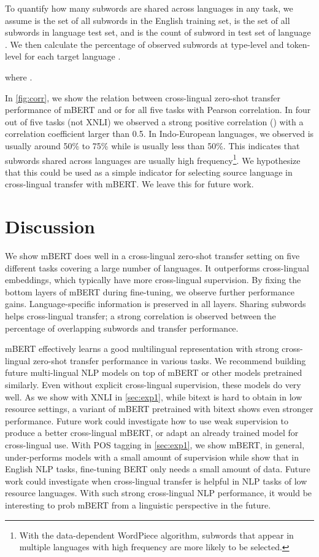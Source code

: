 \documentclass[11pt,a4paper]{article}
\begin{document}
To quantify how many subwords are shared across languages in any task, we assume  is the set of all subwords in the English training set,  is the set of all subwords in language  test set, and  is the count of subword  in test set of language . We then calculate the percentage of observed subwords at type-level  and token-level  for each target language .

where .

In \cref{fig:corr}, we show the relation between cross-lingual zero-shot transfer performance of mBERT and  or  for all five tasks with Pearson correlation. In four out of five tasks (not XNLI) we observed a strong positive correlation  () with a correlation coefficient larger than 0.5. In Indo-European languages, we observed  is usually around 50\% to 75\% while  is usually less than 50\%. This indicates that subwords shared across languages are usually high frequency\footnote{With the data-dependent WordPiece algorithm, subwords that appear in multiple languages with high frequency are more likely to be selected.}. We hypothesize that this could be used as a simple indicator for selecting source language in cross-lingual transfer with mBERT. We leave this for future work.

\section{Discussion}
We show mBERT does well in a cross-lingual zero-shot transfer setting on five different tasks covering a large number of languages. 
It outperforms cross-lingual embeddings, which typically have more cross-lingual supervision. By fixing the bottom layers of mBERT during fine-tuning, we observe further performance gains. Language-specific information is preserved in all layers. Sharing subwords helps cross-lingual transfer; a strong correlation is observed between the percentage of overlapping subwords and transfer performance.

mBERT effectively learns a good multilingual representation with strong cross-lingual zero-shot transfer performance in various tasks. We recommend building future multi-lingual NLP models on top of mBERT or other models pretrained similarly. Even without explicit cross-lingual supervision, these models do very well. As we show with XNLI in \cref{sec:exp1}, while bitext is hard to obtain in low resource settings, a variant of mBERT pretrained with bitext \cite{lample2019cross} shows even stronger performance. Future work could investigate how to use weak supervision to produce a better cross-lingual mBERT, or adapt an already trained model for cross-lingual use. With POS tagging in \cref{sec:exp1}, we show mBERT, in general, under-performs models with a small amount of supervision while \citet{devlin-etal-2019-bert} show that in English NLP tasks, fine-tuning BERT only needs a small amount of data. Future work could investigate when cross-lingual transfer is helpful in NLP tasks of low resource languages. With such strong cross-lingual NLP performance, it would be interesting to prob mBERT from a linguistic perspective in the future.








\cleardoublepage
\appendix
\end{document}
